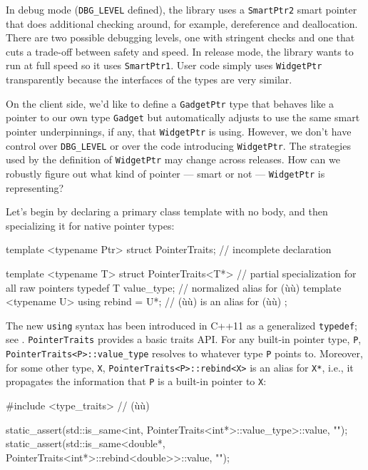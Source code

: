 \noindent In debug mode (\lstinline!DBG_LEVEL! defined), the library uses a
\lstinline!SmartPtr2! smart pointer that does additional checking around,
for example, dereference and deallocation. There are two possible
debugging levels, one with stringent checks and one that cuts a
trade-off between safety and speed. In release mode, the library wants
to run at full speed so it uses \lstinline!SmartPtr1!. User code simply
uses \lstinline!WidgetPtr! transparently because the interfaces of the
types are very similar.

On the client side, we'd like to define a \lstinline!GadgetPtr! type that
behaves like a pointer to our own type \lstinline!Gadget! but automatically
adjusts to use the same smart pointer underpinnings, if any, that
\lstinline!WidgetPtr! is using. However, we don't have control over
\lstinline!DBG_LEVEL! or over the code introducing \lstinline!WidgetPtr!. The
strategies used by the definition of \lstinline!WidgetPtr! may change
across releases. How can we robustly figure out what kind of pointer ---
smart or not --- \lstinline!WidgetPtr! is representing?

Let's begin by declaring a primary class template with no body, and then
specializing it for native pointer types:

\begin{emcppslisting}[emcppsbatch=e40]
template <typename Ptr>
struct PointerTraits;       // incomplete declaration

template <typename T>
struct PointerTraits<T*>   // partial specialization for all raw pointers
{
    typedef T value_type;  // normalized alias for (ù{}ù)
    template <typename U>
    using rebind = U*;     // (ù{}ù) is an alias for (ù{}ù)
};
\end{emcppslisting}
    

\noindent The new \lstinline!using! syntax has been introduced in C++11 as a
generalized \lstinline!typedef!; see . \lstinline!PointerTraits! provides a basic
traits API. For any built-in pointer type, \lstinline!P!,
\lstinline!PointerTraits<P>::value_type! resolves to whatever type
\lstinline!P! points to. Moreover, for some other type, \lstinline!X!,
\lstinline!PointerTraits<P>::rebind<X>! is an alias for \lstinline!X*!, i.e.,
it propagates the information that \lstinline!P! is a built-in pointer to
\lstinline!X!:

\begin{emcppslisting}[emcppsbatch=e40]
#include <type_traits>  // (ù{}ù)

static_assert(std::is_same<int, PointerTraits<int*>::value_type>::value, "");
static_assert(std::is_same<double*,
                           PointerTraits<int*>::rebind<double>>::value, "");
\end{emcppslisting}
    
